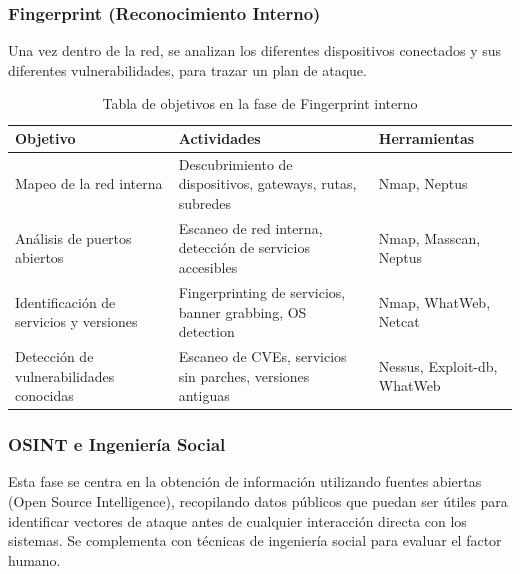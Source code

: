\documentclass[a4paper, 11pt]{article}
\begin{document}
\subsubsection{Fingerprint (Reconocimiento Interno)}

Una vez dentro de la red, se analizan los diferentes dispositivos conectados y sus diferentes vulnerabilidades, para trazar un plan de ataque.

\begin{table}[H]
\centering
\renewcommand{\arraystretch}{1.4}
\begin{tabular}{|p{4.3cm}|p{6.5cm}|p{4.3cm}|}
\hline
\textbf{Objetivo} & \textbf{Actividades} & \textbf{Herramientas} \\
\hline
Mapeo de la red interna & Descubrimiento de dispositivos, gateways, rutas, subredes & Nmap, Neptus \\
\hline
Análisis de puertos abiertos & Escaneo de red interna, detección de servicios accesibles & Nmap, Masscan, Neptus \\
\hline
Identificación de servicios y versiones & Fingerprinting de servicios, banner grabbing, OS detection & Nmap, WhatWeb, Netcat \\
\hline
Detección de vulnerabilidades conocidas & Escaneo de CVEs, servicios sin parches, versiones antiguas & Nessus, Exploit-db, WhatWeb \\
\hline
\end{tabular}
\caption{Tabla de objetivos en la fase de Fingerprint interno}
\end{table}





\subsubsection{OSINT e Ingeniería Social}

Esta fase se centra en la obtención de información utilizando fuentes abiertas (Open Source Intelligence), recopilando datos públicos que puedan ser útiles para identificar vectores de ataque antes de cualquier interacción directa con los sistemas. Se complementa con técnicas de ingeniería social para evaluar el factor humano.
\end{document}
